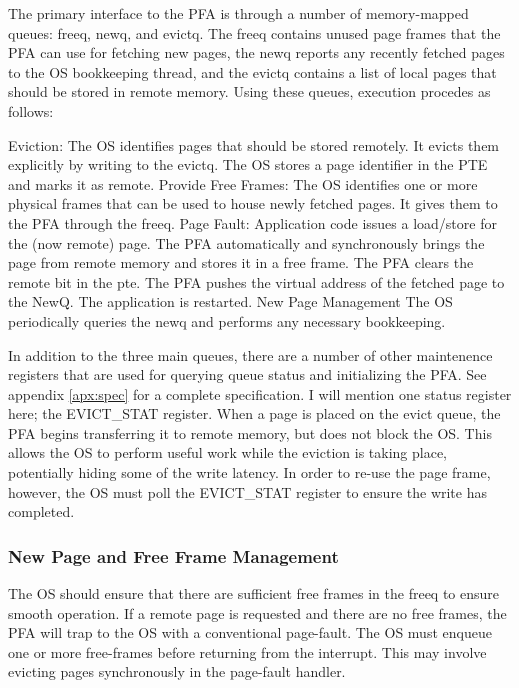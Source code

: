 The primary interface to the PFA is through a number of memory-mapped queues:
\gls{freeq}, \gls{newq}, and \gls{evictq}. The \gls{freeq} contains unused page frames that the PFA can
use for fetching new pages, the \gls{newq} reports any recently fetched pages to the
OS bookkeeping thread, and the \gls{evictq} contains a list of local pages that
should be stored in remote memory. Using these queues, execution procedes as
follows:

\begin{outline}[enumerate]
  \1 Eviction:
      \2 The OS identifies pages that should be stored remotely.
      \2 It evicts them explicitly by writing to the \gls{evictq}.
      \2 The OS stores a page identifier in the PTE and marks it as remote.
  \1 Provide Free Frames:
      \2 The OS identifies one or more physical frames that can be used to
      house newly fetched pages.
      \2 It gives them to the PFA through the \gls{freeq}.
  \1 Page Fault:
      \2 Application code issues a load/store for the (now remote) page.
      \2 The PFA automatically and synchronously brings the page from remote
      memory and stores it in a free frame.
      \2 The PFA clears the remote bit in the pte.
      \2 The PFA pushes the virtual address of the fetched page to the NewQ.
      \2 The application is restarted.
  \1 New Page Management
      \2 The OS periodically queries the \gls{newq} and performs any
      necessary bookkeeping.
\end{outline}

In addition to the three main queues, there are a number of other maintenence
registers that are used for querying queue status and initializing the PFA. See
appendix \ref{apx:spec} for a complete specification. I will mention one status
register here; the EVICT\_STAT register. When a page is placed on the evict
queue, the PFA begins transferring it to remote memory, but does not block
the OS. This allows the OS to perform useful work while the eviction is taking
place, potentially hiding some of the write latency. In order to re-use the
page frame, however, the OS must poll the EVICT\_STAT register to ensure the
write has completed.

\subsubsection{New Page and Free Frame Management}
The OS should ensure that there are sufficient free frames in the \gls{freeq} to
ensure smooth operation. If a remote page is requested and there are no free
frames, the PFA will trap to the OS with a conventional page-fault. The OS must
enqueue one or more free-frames before returning from the interrupt. This may
involve evicting pages synchronously in the page-fault handler.

